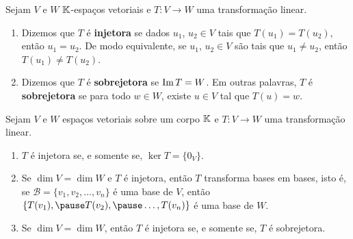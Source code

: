 \documentclass{beamer}
\begin{document}
\begin{frame}
    \begin{definicao}
        Sejam $V$ e $W$ $\mathbb{K}$-espa\c{c}os vetoriais \pause e $T \colon V \to W$ uma transforma\c{c}\~ao linear.\pause
        \begin{enumerate}[label={\roman*})]
            \item Dizemos que $T$ \'e \textbf{injetora} \pause se dados $u_1$, $u_2 \in V$ \pause tais que $T(u_1) = T(u_2)$, \pause ent\~ao $u_1 = u_2$. \pause De modo equivalente, \pause se $u_1$, $u_2 \in V$ s\~ao tais que $u_1 \ne u_2$, \pause ent\~ao $T(u_1) \ne T(u_2)$.\pause

            \vspace{.5cm}

            \item Dizemos que $T$ \'e \textbf{sobrejetora} \pause se ${\rm Im\,} T = W$. \pause Em outras palavras, \pause $T$ \'e \textbf{sobrejetora} se para todo $w \in W$, \pause existe $u \in V$ tal que $T(u) = w$.\pause
        \end{enumerate}
    \end{definicao}
\end{frame}

\begin{frame}
    \begin{proposicao}\label{caracteriza_transformacao_injetora}
        Sejam $V$ e $W$ espa\c{c}os vetoriais sobre um corpo $\mathbb{K}$ \pause e $T \colon V \to W$ uma transforma\c{c}\~ao linear.
        \begin{enumerate}[label={\roman*})]
            \item $T$ \'e injetora \pause se, e somente se, $\ker T = \{0_V\}$.

            \vspace{.5cm}

            \item Se $\dim V = \dim W$ \pause e $T$ é injetora, \pause então $T$ transforma bases em bases, \pause isto é, se $\mathcal{B} = \{v_1, v_2, \dots, v_n\}$ é uma base de $V$, \pause então $\{T(v_1), \pause T(v_2), \pause \dots, T(v_n)\}$ é uma base de $W$.\pause

            \vspace{.5cm}

            \item Se $\dim V = \dim W$, \pause então $T$ é injetora \pause se, e somente se, \pause $T$ é sobrejetora.
        \end{enumerate}
    \end{proposicao}
\end{frame}
\end{document}
